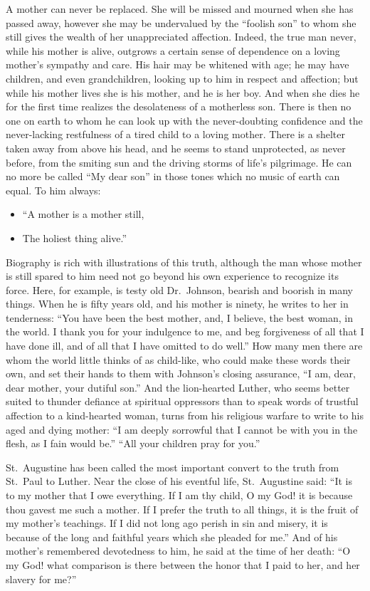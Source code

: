 \documentclass[
]{book}
\providecommand{\tightlist}{%
  \setlength{\itemsep}{0pt}\setlength{\parskip}{0pt}}
\begin{document}
A mother can never be replaced. She will be missed and mourned when she has passed away, however she may be undervalued by the ``foolish son'' to whom she still gives the wealth of her unappreciated affection. Indeed, the true man never, while his mother is alive, outgrows a certain sense of dependence on a loving mother's sympathy and care. His hair may be whitened with age; he may have children, and even grandchildren, looking up to him in respect and affection; but while his mother lives she is his mother, and he is her boy. And when she dies he for the first time realizes the desolateness of a motherless son. There is then no one on earth to whom he can look up with the never-doubting confidence and the never-lacking restfulness of a tired child to a loving mother. There is a shelter taken away from above his head, and he seems to stand unprotected, as never before, from the smiting sun and the driving storms of life's pilgrimage. He can no more be called ``My dear son'' in those tones which no music of earth can equal. To him always:

\begin{itemize}
\tightlist
\item
  ``A mother is a mother still,
\item
  The holiest thing alive.''
\end{itemize}

Biography is rich with illustrations of this truth, although the man whose mother is still spared to him need not go beyond his own experience to recognize its force. Here, for example, is testy old Dr.~Johnson, bearish and boorish in many things. When he is fifty years old, and his mother is ninety, he writes to her in tenderness: ``You have been the best mother, and, I believe, the best woman, in the world. I thank you for your indulgence to me, and beg forgiveness of all that I have done ill, and of all that I have omitted to do well.'' How many men there are whom the world little thinks of as child-like, who could make these words their own, and set their hands to them with Johnson's closing assurance, ``I am, dear, dear mother, your dutiful son.'' And the lion-hearted Luther, who seems better suited to thunder defiance at spiritual oppressors than to speak words of trustful affection to a kind-hearted woman, turns from his religious warfare to write to his aged and dying mother: ``I am deeply sorrowful that I cannot be with you in the flesh, as I fain would be.'' ``All your children pray for you.''

St.~Augustine has been called the most important convert to the truth from St.~Paul to Luther. Near the close of his eventful life, St.~Augustine said: ``It is to my mother that I owe everything. If I am thy child, O my God! it is because thou gavest me such a mother. If I prefer the truth to all things, it is the fruit of my mother's teachings. If I did not long ago perish in sin and misery, it is because of the long and faithful years which she pleaded for me.'' And of his mother's remembered devotedness to him, he said at the time of her death: ``O my God! what comparison is there between the honor that I paid to her, and her slavery for me?''
\end{document}

